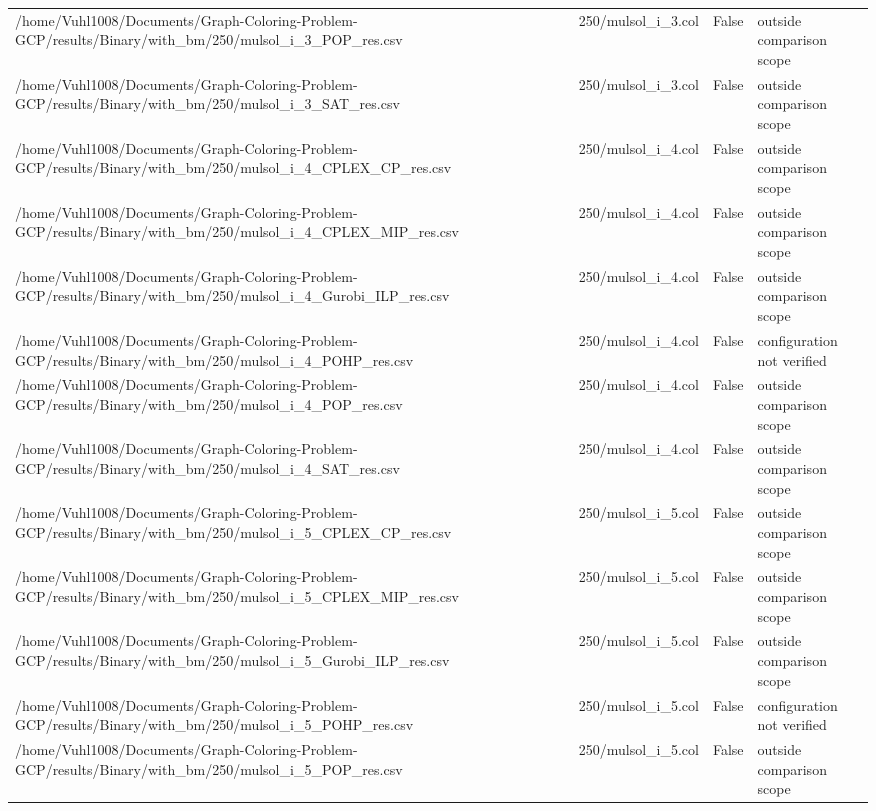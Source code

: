 \begin{table}[htbp]
\begin{tabular}{llll}
/home/Vuhl1008/Documents/Graph-Coloring-Problem-GCP/results/Binary/with\_bm/250/mulsol\_i\_3\_POP\_res.csv & 250/mulsol\_i\_3.col & False & outside comparison scope \\
/home/Vuhl1008/Documents/Graph-Coloring-Problem-GCP/results/Binary/with\_bm/250/mulsol\_i\_3\_SAT\_res.csv & 250/mulsol\_i\_3.col & False & outside comparison scope \\
/home/Vuhl1008/Documents/Graph-Coloring-Problem-GCP/results/Binary/with\_bm/250/mulsol\_i\_4\_CPLEX\_CP\_res.csv & 250/mulsol\_i\_4.col & False & outside comparison scope \\
/home/Vuhl1008/Documents/Graph-Coloring-Problem-GCP/results/Binary/with\_bm/250/mulsol\_i\_4\_CPLEX\_MIP\_res.csv & 250/mulsol\_i\_4.col & False & outside comparison scope \\
/home/Vuhl1008/Documents/Graph-Coloring-Problem-GCP/results/Binary/with\_bm/250/mulsol\_i\_4\_Gurobi\_ILP\_res.csv & 250/mulsol\_i\_4.col & False & outside comparison scope \\
/home/Vuhl1008/Documents/Graph-Coloring-Problem-GCP/results/Binary/with\_bm/250/mulsol\_i\_4\_POHP\_res.csv & 250/mulsol\_i\_4.col & False & configuration not verified \\
/home/Vuhl1008/Documents/Graph-Coloring-Problem-GCP/results/Binary/with\_bm/250/mulsol\_i\_4\_POP\_res.csv & 250/mulsol\_i\_4.col & False & outside comparison scope \\
/home/Vuhl1008/Documents/Graph-Coloring-Problem-GCP/results/Binary/with\_bm/250/mulsol\_i\_4\_SAT\_res.csv & 250/mulsol\_i\_4.col & False & outside comparison scope \\
/home/Vuhl1008/Documents/Graph-Coloring-Problem-GCP/results/Binary/with\_bm/250/mulsol\_i\_5\_CPLEX\_CP\_res.csv & 250/mulsol\_i\_5.col & False & outside comparison scope \\
/home/Vuhl1008/Documents/Graph-Coloring-Problem-GCP/results/Binary/with\_bm/250/mulsol\_i\_5\_CPLEX\_MIP\_res.csv & 250/mulsol\_i\_5.col & False & outside comparison scope \\
/home/Vuhl1008/Documents/Graph-Coloring-Problem-GCP/results/Binary/with\_bm/250/mulsol\_i\_5\_Gurobi\_ILP\_res.csv & 250/mulsol\_i\_5.col & False & outside comparison scope \\
/home/Vuhl1008/Documents/Graph-Coloring-Problem-GCP/results/Binary/with\_bm/250/mulsol\_i\_5\_POHP\_res.csv & 250/mulsol\_i\_5.col & False & configuration not verified \\
/home/Vuhl1008/Documents/Graph-Coloring-Problem-GCP/results/Binary/with\_bm/250/mulsol\_i\_5\_POP\_res.csv & 250/mulsol\_i\_5.col & False & outside comparison scope \\

\end{tabular}
\end{table}
